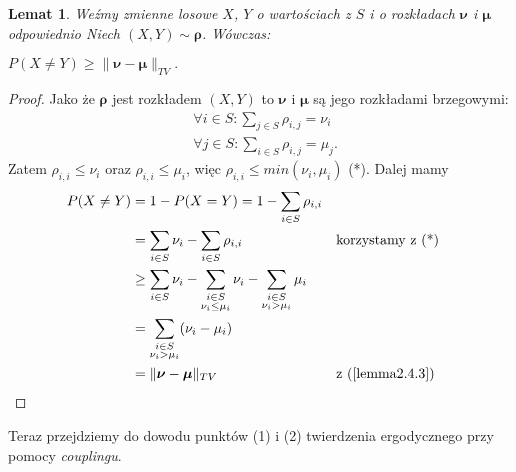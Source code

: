 \documentclass[a4paper]{article}
\theoremstyle{defn}
\theoremstyle{theorem}
\theoremstyle{lemma}
\newtheorem{lemma}[defn]{Lemat}
\theoremstyle{cor}
\theoremstyle{fact}
\begin{document}
\begin{lemma}\label{lemma2.4.4}
Weźmy zmienne losowe $X$, $Y$ o wartościach z $S$ i o rozkładach $\boldsymbol{\nu}$ i $\boldsymbol{\mu}$ odpowiednio Niech $(X, Y) \sim \boldsymbol{\rho}$. Wówczas:
\begin{center}
$P(X \neq Y) \geq \|\boldsymbol{\nu} - \boldsymbol{\mu}\|_{TV}.$
\end{center}
\end{lemma}
\begin{proof}
Jako że $\boldsymbol{\rho}$ jest rozkładem $(X,Y)$ to $\boldsymbol{\nu}$ i $\boldsymbol{\mu}$ są jego rozkładami brzegowymi:
\begin{align*}
&\forall i \in S: \sum\limits_{j \in S} \rho_{i, j} = \nu_i\\
&\forall j \in S: \sum\limits_{i \in S} \rho_{i, j} = \mu_j.
\end{align*}
Zatem
$\rho_{i, i} \leq \nu_i$ oraz $\rho_{i, i} \leq \mu_i$, więc $\rho_{i,i} \leq min(\nu_i, \mu_i)$ (*). Dalej mamy
\begin{align*}
P(X \neq Y) &= 1 - P(X = Y) = 1 - \sum\limits_{i \in S} \rho_{i, i} \\
&= \sum\limits_{i \in S} \nu_i - \sum\limits_{i \in S} \rho_{i, i}  && \text{korzystamy z (*)}\\
&\geq \sum\limits_{i \in S} \nu_i - \sum\limits_{\substack{i \in S\\ \nu_i \leq \mu_i}} \nu_i - \sum\limits_{\substack{i \in S\\ \nu_i > \mu_i}} \mu_i \\
&= \sum\limits_{\substack{i \in S\\ \nu_i > \mu_i}} (\nu_i - \mu_i) \\
&= \|\boldsymbol{\nu} - \boldsymbol{\mu}\|_{TV} && \text{z (\ref{lemma2.4.3})}
\end{align*}
\end{proof}

Teraz przejdziemy do dowodu punktów (1) i (2) twierdzenia ergodycznego przy pomocy \textit{couplingu}.
\end{document}
